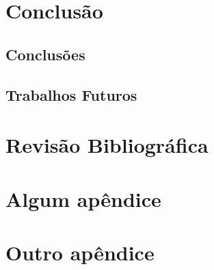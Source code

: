 \documentclass{ufpatcc}
\begin{document}
  \chapter{Conclusão}

		\section{Conclusões}

		\section{Trabalhos Futuros}

  \chapter{Revisão Bibliográfica}
    \lipsum[2]\cite{atalhoonline}


  \appendix
    \chapter{Algum apêndice}
    \chapter{Outro apêndice}

  
\end{document}
